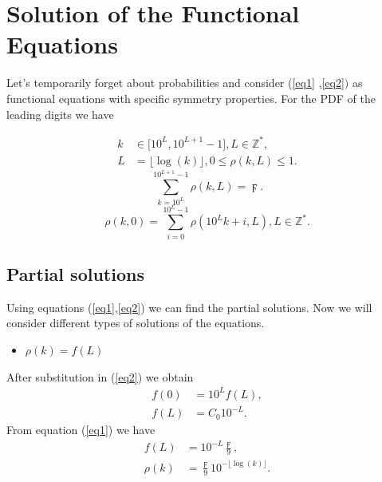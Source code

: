 \documentclass[titlepage,fleqn]{article}%
\providecommand{\U}[1]{\protect\rule{.1in}{.1in}}
\begin{document}
\appendix


\section{Solution of the Functional Equations}%

\label{SofFE}%


Let's temporarily forget about probabilities and consider (\ref{eq1}%
,\ref{eq2}$)$ as functional equations with specific symmetry properties. For
the PDF of the leading digits we have%

\begin{align*}
k  &  \in\lbrack10^{L},10^{L+1}-1],L\in%
\mathbb{Z}
^{\ast},\\
L  &  =\lfloor\log(k)\rfloor,0\leq\rho(k,L)\leq1.
\end{align*}%
\begin{equation}%
{\displaystyle\sum\limits_{k=10^{L}}^{10^{L+1}-1}}
\rho(k,L)=\digamma. \label{eq1}%
\end{equation}%
\begin{equation}
\rho(k,0)=%
{\displaystyle\sum\limits_{i=0}^{10^{L}-1}}
\rho(10^{L}k+i,L),L\in%
\mathbb{Z}
^{\ast}. \label{eq2}%
\end{equation}


\subsection{Partial solutions}%

\label{PartialSolutions}%
Using equations (\ref{eq1},\ref{eq2}) we can find the partial solutions. Now
we will consider different types of solutions of the equations.

\begin{itemize}
\item $\rho(k)=f(L)$
\end{itemize}

After substitution in (\ref{eq2}) we obtain%
\begin{align*}
f(0)  &  =10^{L}f(L),\\
f(L)  &  =C_{0}10^{-L}.
\end{align*}
From equation (\ref{eq1}) we have%
\begin{align}
f(L)  &  =10^{-L}\frac{\digamma}{9},\label{SolL}\\
\rho(k)  &  =\frac{\digamma}{9}10^{-\lfloor\log(k)\rfloor}.\nonumber
\end{align}
\end{document}
